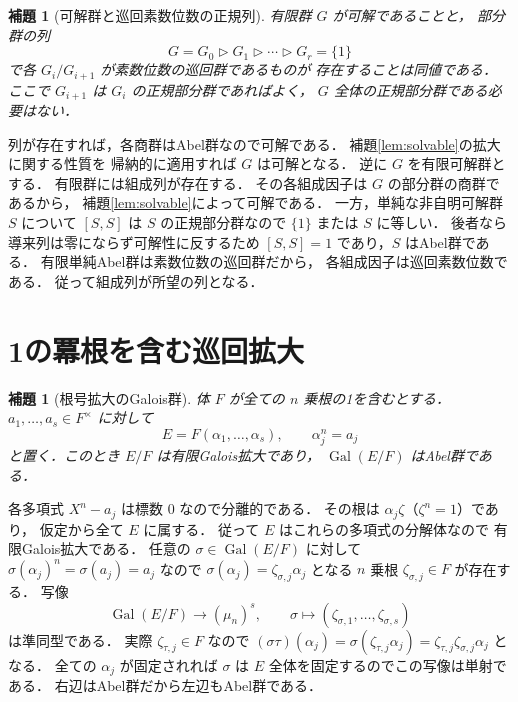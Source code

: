 \documentclass[a5paper,10pt,onecolumn]{jsarticle}
\makeatletter
\theoremstyle{mathnotetheorem}
\newtheorem{lemma}[theorem]{補題}
\renewcommand{\proofname}{証明}
\renewenvironment{proof}[1][\proofname]{%
  \par\pushQED{\qed}\normalfont\topsep4\p@\@plus2\p@\relax
  \trivlist\item[\hskip\labelsep\bfseries #1]\ignorespaces
}{\popQED\endtrivlist\@endpefalse}
\makeatother
\begin{document}
\begin{lemma}[可解群と巡回素数位数の正規列]\label{lem:composition}
有限群 $G$ が可解であることと，
部分群の列
\[
 G=G_0\triangleright G_1\triangleright\cdots
 \triangleright G_r=\{1\}
\]
で各 $G_i/G_{i+1}$ が素数位数の巡回群であるものが
存在することは同値である．
ここで $G_{i+1}$ は $G_i$ の正規部分群であればよく，
$G$ 全体の正規部分群である必要はない．
\end{lemma}
\begin{proof}
列が存在すれば，各商群はAbel群なので可解である．
補題\ref{lem:solvable}の拡大に関する性質を
帰納的に適用すれば $G$ は可解となる．
逆に $G$ を有限可解群とする．
有限群には組成列が存在する．
その各組成因子は $G$ の部分群の商群であるから，
補題\ref{lem:solvable}によって可解である．
一方，単純な非自明可解群 $S$ について
$[S,S]$ は $S$ の正規部分群なので
$\{1\}$ または $S$ に等しい．
後者なら導来列は零にならず可解性に反するため
$[S,S]=1$ であり，$S$ はAbel群である．
有限単純Abel群は素数位数の巡回群だから，
各組成因子は巡回素数位数である．
従って組成列が所望の列となる．
\end{proof}

\section{1の冪根を含む巡回拡大}

\begin{lemma}[根号拡大のGalois群]\label{lem:kummer-abelian}
体 $F$ が全ての $n$ 乗根の1を含むとする．
$a_1,\dots,a_s\in F^\times$ に対して
\[
 E=F(\alpha_1,\dots,\alpha_s),\qquad
 \alpha_j^n=a_j
\]
と置く．このとき $E/F$ は有限Galois拡大であり，
$\operatorname{Gal}(E/F)$ はAbel群である．
\end{lemma}
\begin{proof}
各多項式 $X^n-a_j$ は標数 $0$ なので分離的である．
その根は $\alpha_j\zeta$（$\zeta^n=1$）であり，
仮定から全て $E$ に属する．
従って $E$ はこれらの多項式の分解体なので
有限Galois拡大である．
任意の $\sigma\in\operatorname{Gal}(E/F)$ に対して
$\sigma(\alpha_j)^n=\sigma(a_j)=a_j$ なので
$\sigma(\alpha_j)=\zeta_{\sigma,j}\alpha_j$
となる $n$ 乗根 $\zeta_{\sigma,j}\in F$ が存在する．
写像
\[
 \operatorname{Gal}(E/F)\to(\mu_n)^s,\qquad
 \sigma\mapsto(\zeta_{\sigma,1},\dots,\zeta_{\sigma,s})
\]
は準同型である．
実際 $\zeta_{\tau,j}\in F$ なので
$(\sigma\tau)(\alpha_j)
 =\sigma(\zeta_{\tau,j}\alpha_j)
 =\zeta_{\tau,j}\zeta_{\sigma,j}\alpha_j$
となる．
全ての $\alpha_j$ が固定されれば $\sigma$ は
$E$ 全体を固定するのでこの写像は単射である．
右辺はAbel群だから左辺もAbel群である．
\end{proof}
\end{document}
